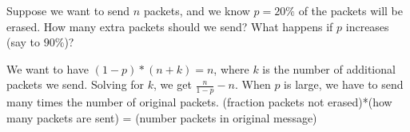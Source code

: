 \question Suppose we want to send $n$ packets, and we know $p = 20\%$ 
of the packets will be erased. How many extra packets should we send? 
What happens if $p$ increases (say to $90\%$)?
\begin{solution}
We want to have $(1-p)*(n + k) = n$, where $k$ is the number of 
additional packets we send. Solving for $k$, we get $\frac{n}{1 - p} - n$.  
When $p$ is large, we have to send many times the number of original packets. 
(fraction packets not erased)*(how many packets are sent) = (number 
packets in original message)
\end{solution}
